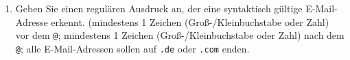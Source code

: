 \documentclass{bschlangaul-aufgabe}
\begin{document}
\begin{enumerate}
\begin{description}
\begin{bAntwort}
\end{bAntwort}
\end{description}

%

\item Geben Sie einen regulären Ausdruck an, der eine syntaktisch
gültige E-Mail-Adresse erkennt. (mindestens 1 Zeichen
(Groß-/Kleinbuchstabe oder Zahl) vor dem \texttt{@}; mindestens 1
Zeichen (Groß-/Kleinbuchstabe oder Zahl) nach dem \texttt{@}; alle
E-Mail-Adressen sollen auf \texttt{.de} oder \texttt{.com} enden.

\begin{bAntwort}
\end{bAntwort}
\end{enumerate}

\begin{bAntwort}
\end{bAntwort}
\end{document}

